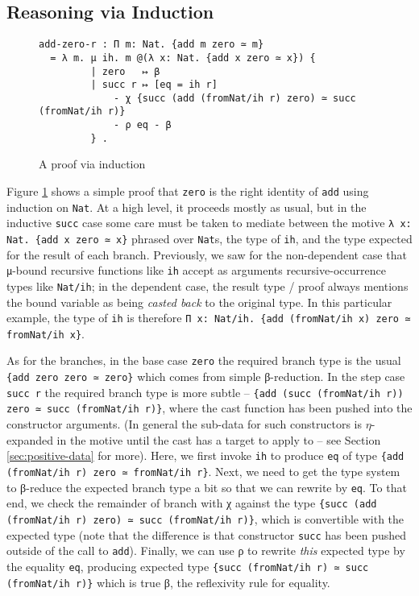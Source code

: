 \documentclass{article}
\begin{document}
\subsection{Reasoning via Induction}
\label{sec:induction}
\begin{figure}[h]
\begin{verbatim}
add-zero-r : Π m: Nat. {add m zero ≃ m}
  = λ m. μ ih. m @(λ x: Nat. {add x zero ≃ x}) {
         | zero   ↦ β
         | succ r ↦ [eq = ih r]
             - χ {succ (add (fromNat/ih r) zero) ≃ succ (fromNat/ih r)}
             - ρ eq - β
         } .
\end{verbatim}
  \caption{A proof via induction}
  \label{fig:ex-data-ind}
\end{figure}
Figure \ref{fig:ex-data-ind} shows a simple proof that \texttt{zero} is the
right identity of \texttt{add} using induction on \texttt{Nat}. At a high level,
it proceeds mostly as usual, but in the inductive \texttt{succ} case some care
must be taken to mediate between the motive \verb;λ x: Nat. {add x zero ≃ x};
phrased over \texttt{Nat}s, the type of \texttt{ih}, and the type expected for
the result of each branch. Previously, we saw for the non-dependent case that
\texttt{μ}-bound recursive functions like \texttt{ih} accept as arguments
recursive-occurrence types like \texttt{Nat/ih}; in the dependent case, the
result type / proof always mentions the bound variable as being \textit{casted
  back} to the original type. In this particular example, the type of
\texttt{ih} is therefore \verb;Π x: Nat/ih. {add (fromNat/ih x) zero ≃ fromNat/ih x};.

As for the branches, in the base case \texttt{zero} the required branch type is
the usual \verb;{add zero zero ≃ zero}; which comes from simple β-reduction. In
the step case \texttt{succ r} the required branch type is more subtle --
\verb;{add (succ (fromNat/ih r)) zero ≃ succ (fromNat/ih r)};, where the cast
function has been pushed into the constructor arguments. (In general the
sub-data for such constructors is $\eta$-expanded in the motive until the cast
has a target to apply to -- see Section \ref{sec:positive-data} for more). Here,
we first invoke \texttt{ih} to produce \texttt{eq} of type
\verb;{add (fromNat/ih r) zero ≃ fromNat/ih r};. Next, we need to get the type system to
β-reduce the expected branch type a bit so that we can rewrite by \texttt{eq}. To that
end, we check the remainder of branch with χ against the type
\verb;{succ (add (fromNat/ih r) zero) ≃ succ (fromNat/ih r)};, which is convertible with the
expected type (note that the difference is that constructor \texttt{succ} has
been pushed outside of the call to \texttt{add}). Finally, we can use ρ to
rewrite \textit{this} expected type by the equality \texttt{eq}, producing
expected type \verb;{succ (fromNat/ih r) ≃ succ (fromNat/ih r)}; which is true
β, the reflexivity rule for equality.
\end{document}
